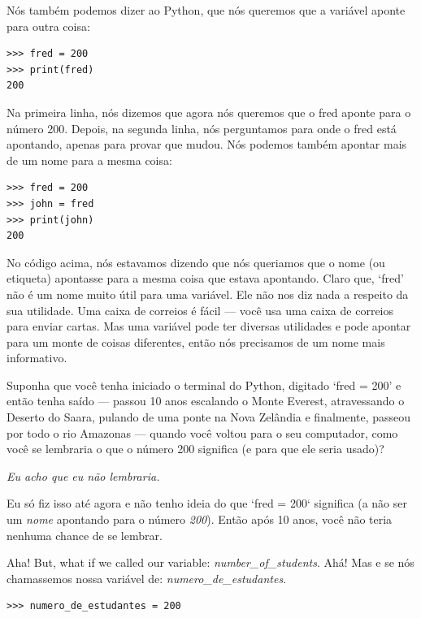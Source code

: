 Nós também podemos dizer ao Python, que nós queremos que a variável  aponte para outra coisa:

\begin{listing}
\begin{verbatim}
>>> fred = 200
>>> print(fred)
200
\end{verbatim}
\end{listing}

\noindent
Na primeira linha, nós dizemos que agora nós queremos que o fred aponte para o número 200. Depois, na segunda linha, nós perguntamos para onde o fred está apontando, apenas para provar que mudou. Nós podemos também apontar mais de um nome para a mesma coisa:

\begin{listing}
\begin{verbatim}
>>> fred = 200
>>> john = fred
>>> print(john)
200
\end{verbatim}
\end{listing}

No código acima, nós estavamos dizendo que nós queriamos que o nome (ou etiqueta)  apontasse para a mesma coisa que  estava apontando.
Claro que, `fred' não é um nome muito útil para uma variável. Ele não nos diz nada a respeito da sua utilidade. Uma caixa de correios é fácil --- você usa uma caixa de correios para enviar cartas. Mas uma variável pode ter diversas utilidades e pode apontar para um monte de coisas diferentes, então nós precisamos de um nome mais informativo.
\par
Suponha que você tenha iniciado o terminal do Python, digitado `fred = 200' e então tenha saído --- passou 10 anos escalando o Monte Everest, atravessando o Deserto do Saara, pulando de uma ponte na Nova Zelândia e finalmente, passeou por todo o rio Amazonas --- quando você voltou para o seu computador, como você se lembraria o que o número 200 significa (e para que ele seria usado)?

\noindent
\emph{Eu acho que eu não lembraria.}

\noindent
Eu só fiz isso até agora e não tenho ideia do que `fred = 200` significa (a não ser um \emph{nome} apontando para o número \emph{200}). Então após 10 anos, você não teria nenhuma chance de se lembrar.
\par
Aha!  But, what if we called our variable: \emph{number\_of\_students}.
Ahá! Mas e se nós chamassemos nossa variável de: \emph{numero\_de\_estudantes}.

\begin{listing}
\begin{verbatim}
>>> numero_de_estudantes = 200
\end{verbatim}
\end{listing}

